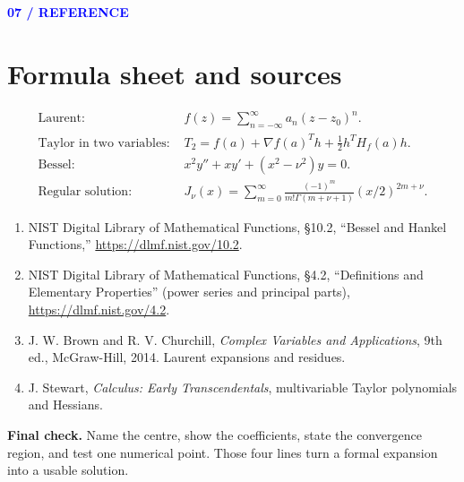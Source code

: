 \documentclass[11pt]{article}
\newcommand{\sectiontag}[1]{\textcolor{blue}{\sffamily\footnotesize\bfseries #1}\par\vspace{2pt}}
\begin{document}
\sectiontag{07 / REFERENCE}\section*{Formula sheet and sources}
\begin{keybox}
\begin{align*}
\text{Laurent: }&f(z)=\sum_{n=-\infty}^{\infty}a_n(z-z_0)^n.\\
\text{Taylor in two variables: }&T_2=f(a)+\nabla f(a)^Th+\tfrac12h^TH_f(a)h.\\
\text{Bessel: }&x^2y''+xy'+(x^2-\nu^2)y=0.\\
\text{Regular solution: }&J_\nu(x)=\sum_{m=0}^\infty\frac{(-1)^m}{m!\Gamma(m+\nu+1)}(x/2)^{2m+\nu}.
\end{align*}
\end{keybox}
\small
\begin{enumerate}[leftmargin=*,itemsep=3pt]
\item NIST Digital Library of Mathematical Functions, §10.2, “Bessel and Hankel Functions,” \url{https://dlmf.nist.gov/10.2}.
\item NIST Digital Library of Mathematical Functions, §4.2, “Definitions and Elementary Properties” (power series and principal parts), \url{https://dlmf.nist.gov/4.2}.
\item J. W. Brown and R. V. Churchill, \emph{Complex Variables and Applications}, 9th ed., McGraw-Hill, 2014. Laurent expansions and residues.
\item J. Stewart, \emph{Calculus: Early Transcendentals}, multivariable Taylor polynomials and Hessians.
\end{enumerate}
\vfill
\begin{bluebox}\textbf{Final check.} Name the centre, show the coefficients, state the convergence region, and test one numerical point. Those four lines turn a formal expansion into a usable solution.
\end{bluebox}
\end{document}

